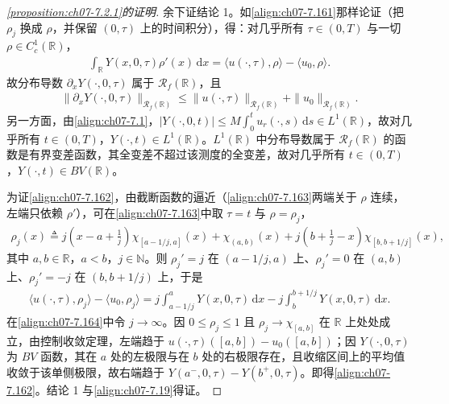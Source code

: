 \documentclass[../../main.tex]{subfiles}%
\begin{document}
\begin{proof}[\cref{proposition:ch07-7.2.1}的证明]
余下证结论 1。如\eqref{align:ch07-7.161}那样论证（把 $\rho_j$ 换成 $\rho$，并保留 $(0,\tau)$ 上的时间积分），得：对几乎所有 $\tau\in(0,T)$ 与一切 $\rho\in C_c^1(\mathbb{R})$，
\begin{align}
\int_\mathbb{R}Y(x,0,\tau)\rho'(x)\,\mathrm{d}x=\langle u(\cdot,\tau),\rho\rangle-\langle u_0,\rho\rangle . \label{align:ch07-7.163}
\end{align}
故分布导数 $\partial_xY(\cdot,0,\tau)$ 属于 $\mathscr{R}_f(\mathbb{R})$，且
\begin{align*}
\|\partial_xY(\cdot,0,\tau)\|_{\mathscr{R}_f(\mathbb{R})}\leqslant\|u(\cdot,\tau)\|_{\mathscr{R}_f(\mathbb{R})}+\|u_0\|_{\mathscr{R}_f(\mathbb{R})}.
\end{align*}
另一方面，由\eqref{align:ch07-7.1}，$|Y(\cdot,0,t)|\leqslant M\int_0^tu_r(\cdot,s)\,\mathrm{d}s\in L^1(\mathbb{R})$，故对几乎所有 $t\in(0,T)$，$Y(\cdot,t)\in L^1(\mathbb{R})$。$L^1(\mathbb{R})$ 中分布导数属于 $\mathscr{R}_f(\mathbb{R})$ 的函数是有界变差函数，其全变差不超过该测度的全变差，故对几乎所有 $t\in(0,T)$，$Y(\cdot,t)\in BV(\mathbb{R})$。

为证\eqref{align:ch07-7.162}，由截断函数的逼近（\eqref{align:ch07-7.163}两端关于 $\rho$ 连续，左端只依赖 $\rho'$），可在\eqref{align:ch07-7.163}中取 $\tau=t$ 与 $\rho=\rho_j$，
\begin{align*}
\rho_j(x)\triangleq j\left(x-a+\frac1j\right)\chi_{[a-1/j,a]}(x)+\chi_{(a,b)}(x)+j\left(b+\frac1j-x\right)\chi_{[b,b+1/j]}(x),
\end{align*}
其中 $a,b\in\mathbb{R}$，$a<b$，$j\in\mathbb{N}$。则 $\rho_j'=j$ 在 $(a-1/j,a)$ 上、$\rho_j'=0$ 在 $(a,b)$ 上、$\rho_j'=-j$ 在 $(b,b+1/j)$ 上，于是
\begin{align}
\langle u(\cdot,\tau),\rho_j\rangle-\langle u_0,\rho_j\rangle=j\int_{a-1/j}^aY(x,0,\tau)\,\mathrm{d}x-j\int_b^{b+1/j}Y(x,0,\tau)\,\mathrm{d}x . \label{align:ch07-7.164}
\end{align}
在\eqref{align:ch07-7.164}中令 $j\to\infty$。因 $0\leqslant\rho_j\leqslant1$ 且 $\rho_j\to\chi_{[a,b]}$ 在 $\mathbb{R}$ 上处处成立，由控制收敛定理，左端趋于 $u(\cdot,\tau)([a,b])-u_0([a,b])$；因 $Y(\cdot,0,\tau)$ 为 $BV$ 函数，其在 $a$ 处的左极限与在 $b$ 处的右极限存在，且收缩区间上的平均值收敛于该单侧极限，故右端趋于 $Y(a^-,0,\tau)-Y(b^+,0,\tau)$。即得\eqref{align:ch07-7.162}。结论 1 与\eqref{align:ch07-7.19}得证。
\end{proof}
\end{document}
